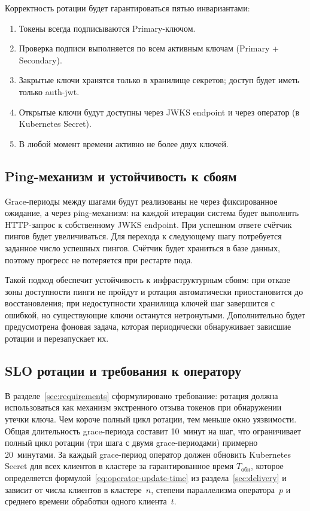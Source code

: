 Корректность ротации будет гарантироваться пятью инвариантами:
\begin{enumerate}
  \item Токены всегда подписываются Primary-ключом.
  \item Проверка подписи выполняется по всем активным ключам (Primary + Secondary).
  \item Закрытые ключи хранятся только в хранилище секретов;
    доступ будет иметь только auth-jwt.
  \item Открытые ключи будут доступны через JWKS endpoint
    и через оператор (в Kubernetes Secret).
  \item В любой момент времени активно не более двух ключей.
\end{enumerate}

\subsection{Ping-механизм и устойчивость к сбоям}\label{subsec:ping}

Grace-периоды между шагами будут реализованы не через фиксированное ожидание,
а через ping-механизм:
на каждой итерации система будет выполнять HTTP-запрос к собственному JWKS endpoint.
При успешном ответе счётчик пингов будет увеличиваться.
Для перехода к следующему шагу потребуется заданное число успешных пингов.
Счётчик будет храниться в базе данных,
поэтому прогресс не потеряется при рестарте пода.

Такой подход обеспечит устойчивость к инфраструктурным сбоям:
при отказе зоны доступности пинги не пройдут
и ротация автоматически приостановится до восстановления;
при недоступности хранилища ключей шаг завершится с ошибкой,
но существующие ключи останутся нетронутыми.
Дополнительно будет предусмотрена фоновая задача,
которая периодически обнаруживает зависшие ротации и перезапускает их.

\subsection{SLO ротации и требования к оператору}\label{subsec:rotation-slo}

В разделе~\ref{sec:requirements} сформулировано требование:
ротация должна использоваться как механизм экстренного отзыва токенов
при обнаружении утечки ключа.
Чем короче полный цикл ротации, тем меньше окно уязвимости.
Общая длительность grace-периода составит 10~минут на шаг,
что ограничивает полный цикл ротации (три шага с двумя grace-периодами)
примерно 20~минутами.
За каждый grace-период оператор должен обновить Kubernetes Secret
для всех клиентов в кластере за гарантированное время $T_{\text{обн}}$,
которое определяется формулой~\eqref{eq:operator-update-time}
из раздела~\ref{sec:delivery} и зависит от числа клиентов в кластере~$n$,
степени параллелизма оператора~$p$
и среднего времени обработки одного клиента~$t$.

